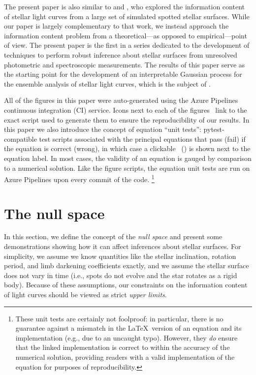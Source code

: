 \documentclass[modern]{aastex62}
\begin{document}
The present paper is also similar to \citet{Walkowicz2013} and
\citet{Basri2020}, who explored the information content of
stellar light curves from a large set of simulated spotted stellar
surfaces. While our paper is largely complementary to
that work, we instead approach the information content problem from
a theoretical---as opposed to empirical---point of view.
%
The present paper is the first in a series dedicated to the development of
techniques to perform robust inference about stellar surfaces from
unresolved photometric and spectroscopic measurements. The results
of this paper serve as the starting point for the development of
an interpretable Gaussian process for the ensemble analysis of
stellar light curves, which is the subject of
.

\vspace{1em}

All of the figures in this paper were auto-generated
using the Azure Pipelines continuous integration (CI) service.
Icons next to each of the figures \codeicon \,
link to the exact script used to generate them to ensure the reproducibility
of our results. In this paper we also introduce the concept of equation
``unit tests'': \textsf{pytest}-compatible test scripts associated
with the principal equations that pass (fail) if the equation is correct (wrong),
in which case a clickable \testpassicon \, (\testfailicon) is shown next to the equation
label.
In most cases, the validity of an equation is gauged by comparison to
a numerical solution. Like the figure scripts, the equation unit tests are
run on Azure Pipelines upon every commit of the code.%
\footnote{
    These unit tests are certainly not foolproof: in particular, there is
    no guarantee against a mismatch in the \LaTeX \, version of an equation
    and its \Python implementation (e.g., due to an uncaught typo). However, they
    \emph{do} ensure that the linked \Python implementation is correct to
    within the accuracy of the numerical solution, providing readers with a
    valid implementation of the equation for purposes of reproducibility.
}

\section{The null space}
\label{sec:nullspace}

In this section, we define the concept of the \emph{null space}
and present some demonstrations showing how it can affect inferences
about stellar surfaces.
For simplicity, we assume we know quantities like the stellar
inclination, rotation period, and limb darkening coefficients
exactly, and we assume the stellar surface does not vary in time
(i.e., spots do not evolve and the star rotates as a rigid body).
Because of these assumptions, our constraints on the information
content of light curves should be viewed as strict \emph{upper limits}.
\end{document}
